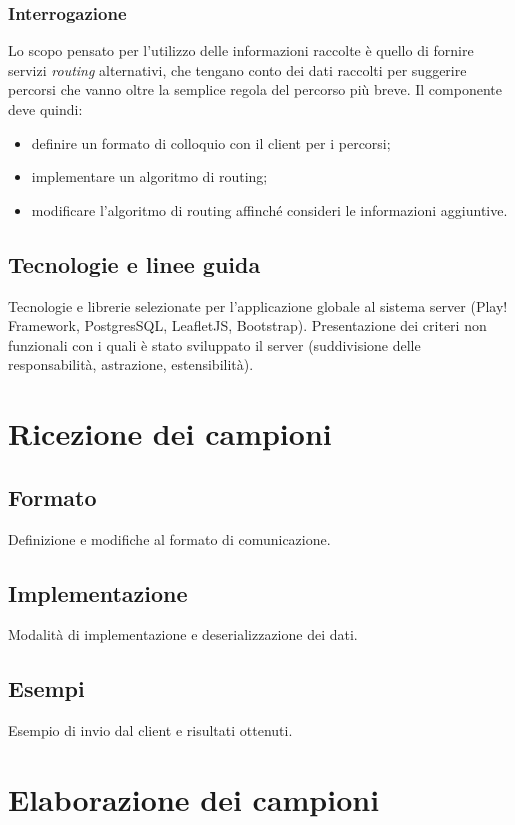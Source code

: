 \documentclass[a4paper, 12pt, twoside, openright]{book}
\begin{document}
\subsection{Interrogazione}
Lo scopo pensato per l'utilizzo delle informazioni raccolte è quello di fornire servizi \emph{routing} alternativi, che tengano conto dei dati raccolti per suggerire percorsi che vanno oltre la semplice regola del percorso più breve. Il componente deve quindi:
\begin{itemize}
\item definire un formato di colloquio con il client per i percorsi;
\item implementare un algoritmo di routing;
\item modificare l'algoritmo di routing affinché consideri le informazioni aggiuntive.
\end{itemize}

\section{Tecnologie e linee guida}
Tecnologie e librerie selezionate per l'applicazione globale al sistema server (Play! Framework, PostgresSQL, LeafletJS, Bootstrap). Presentazione dei criteri non funzionali con i quali è stato sviluppato il server (suddivisione delle responsabilità, astrazione, estensibilità).

\chapter{Ricezione dei campioni} %
\section{Formato}
Definizione e modifiche al formato di comunicazione.
\section{Implementazione}
Modalità di implementazione e deserializzazione dei dati.
\section{Esempi}
Esempio di invio dal client e risultati ottenuti.

\chapter{Elaborazione dei campioni} %
\end{document}
